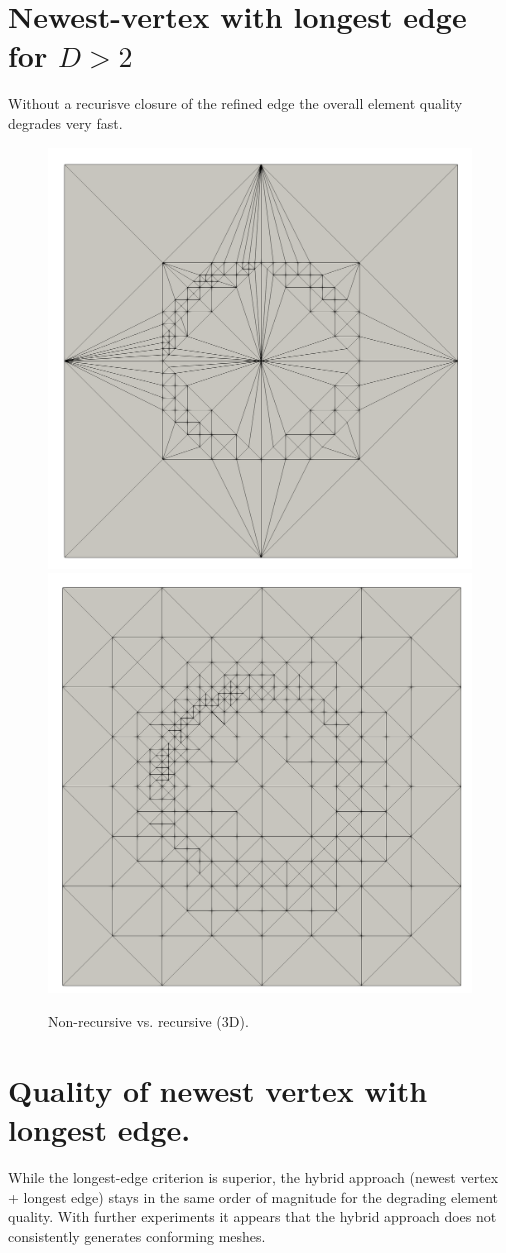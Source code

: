 \documentclass{article}
\begin{document}
\clearpage

\section{Newest-vertex with longest edge for $D>2$}

Without a recurisve closure of the refined edge the overall element quality degrades very fast.

\begin{figure}[htbp]
	\centering
	\includegraphics[width=0.48\linewidth]{figures/non-recursive} \hfill
	\includegraphics[width=0.48\linewidth]{figures/recursive}
	\caption{Non-recursive vs. recursive (3D).}
	\label{fig:metrics}
\end{figure}

\section{Quality of newest vertex with longest edge.}

While the longest-edge criterion is superior, the hybrid approach (newest vertex + longest edge) 
stays in the same order of magnitude for the degrading element quality. 
With further experiments it appears that the hybrid approach does not consistently generates conforming meshes.
\end{document}
